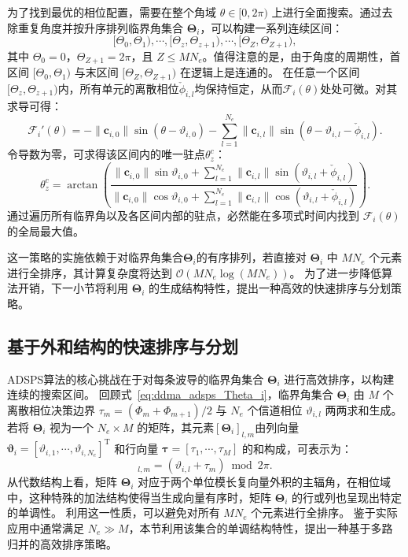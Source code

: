 为了找到最优的相位配置，需要在整个角域 $\theta \in [0, 2\pi)$ 上进行全面搜索。通过去除重复角度并按升序排列临界角集合 $\bm \Theta_i$，可以构建一系列连续区间：
\begin{equation}\label{eq:ddma_adsps_theta_intervals}
	[\Theta_0, \Theta_1), \cdots, [\Theta_z, \Theta_{z+1}), \cdots, [\Theta_Z, \Theta_{Z+1}),
\end{equation}
其中 $\Theta_0 = 0$，$\Theta_{Z+1} = 2\pi$，且 $Z \le MN_e$。值得注意的是，由于角度的周期性，首区间 $[\Theta_0, \Theta_1)$ 与末区间 $[\Theta_Z, \Theta_{Z+1})$ 在逻辑上是连通的。
在任意一个区间$[\Theta_z, \Theta_{z+1})$内，所有单元的离散相位$\check{\phi}_{i,l}$均保持恒定，从而$\mathcal{F}_i(\theta)$处处可微。对其求导可得：
\begin{equation}\label{eq:ddma_adsps_dF}
	\mathcal{F}_i'(\theta) = -\|\bm{c}_{i,0}\|\sin(\theta - \vartheta_{i,0}) - \sum_{l=1}^{N_e}\|\bm c_{i,l}\|\sin(\theta - \vartheta_{i,l} - \check{\phi}_{i,l}).
\end{equation}
令导数为零，可求得该区间内的唯一驻点$\theta_z^c$：
\begin{equation}\label{eq:ddma_adsps_thetazc}
	\theta_z^c = \arctan\left( \frac{\|\bm c_{i,0}\|\sin\vartheta_{i,0}+\sum_{l=1}^{N_e} \|\bm c_{i,l}\| \sin(\vartheta_{i,l}+\check{\phi}_{i,l})}
	{\|\bm c_{i,0}\|\cos\vartheta_{i,0}+\sum_{l=1}^{N_e} \|\bm c_{i,l}\| \cos(\vartheta_{i,l}+\check{\phi}_{i,l})} \right).
\end{equation}
通过遍历所有临界角以及各区间内部的驻点，必然能在多项式时间内找到 $\mathcal{F}_i(\theta)$ 的全局最大值。

这一策略的实施依赖于对临界角集合$\bm \Theta_i$的有序排列，若直接对 $\bm \Theta_i$ 中 $MN_e$ 个元素进行全排序，其计算复杂度将达到 $\mathcal{O}(MN_e \log(MN_e))$。
为了进一步降低算法开销，下一小节将利用 $\bm \Theta_i$ 的生成结构特性，提出一种高效的快速排序与分划策略。

\subsection{基于外和结构的快速排序与分划}

ADSPS算法的核心挑战在于对每条波导的临界角集合 $\bm \Theta_i$ 进行高效排序，以构建连续的搜索区间。
回顾式~\eqref{eq:ddma_adsps_Theta_i}，临界角集合 $\bm \Theta_i$ 由 $M$ 个离散相位决策边界 $\tau_m=(\Phi_m + \Phi_{m+1})/2$ 与 $N_e$ 个信道相位 $\vartheta_{i,l}$ 两两求和生成。
若将 $\bm \Theta_i$ 视为一个 $N_e \times M$ 的矩阵，其元素$[\bm \Theta_i]_{l,m}$由列向量 $\bm \vartheta_i = [\vartheta_{i,1}, \cdots, \vartheta_{i,N_e}]^\mathrm{T}$ 和行向量 $\bm \tau = [\tau_1, \cdots, \tau_M]$ 的和构成，可表示为：
\begin{equation}
	[\bm \Theta_i]_{l,m} = (\vartheta_{i,l} + \tau_m) \bmod 2\pi.
\end{equation}
从代数结构上看，矩阵 $\bm \Theta_i$ 对应于两个单位模长复向量外积的主辐角，在相位域中，这种特殊的加法结构使得当生成向量有序时，矩阵 $\bm \Theta_i$ 的行或列也呈现出特定的单调性。
利用这一性质，可以避免对所有 $MN_e$ 个元素进行全排序。
鉴于实际应用中通常满足 $N_e \gg M$，本节利用该集合的单调结构特性，提出一种基于多路归并的高效排序策略。

